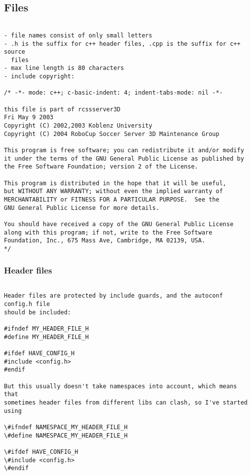 \subsection{Files}
\begin{verbatim}

- file names consist of only small letters
- .h is the suffix for c++ header files, .cpp is the suffix for c++ source 
  files
- max line length is 80 characters
- include copyright:

/* -*- mode: c++; c-basic-indent: 4; indent-tabs-mode: nil -*-
   
this file is part of rcssserver3D
Fri May 9 2003
Copyright (C) 2002,2003 Koblenz University
Copyright (C) 2004 RoboCup Soccer Server 3D Maintenance Group

This program is free software; you can redistribute it and/or modify
it under the terms of the GNU General Public License as published by
the Free Software Foundation; version 2 of the License.
  
This program is distributed in the hope that it will be useful,
but WITHOUT ANY WARRANTY; without even the implied warranty of
MERCHANTABILITY or FITNESS FOR A PARTICULAR PURPOSE.  See the
GNU General Public License for more details.
 
You should have received a copy of the GNU General Public License
along with this program; if not, write to the Free Software
Foundation, Inc., 675 Mass Ave, Cambridge, MA 02139, USA.
*/

\end{verbatim}
\subsubsection{Header files}
\begin{verbatim}

Header files are protected by include guards, and the autoconf config.h file
should be included:

#ifndef MY_HEADER_FILE_H
#define MY_HEADER_FILE_H

#ifdef HAVE_CONFIG_H
#include <config.h>
#endif

But this usually doesn't take namespaces into account, which means that 
sometimes header files from different libs can clash, so I've started using

\#ifndef NAMESPACE_MY_HEADER_FILE_H
\#define NAMESPACE_MY_HEADER_FILE_H

\#ifdef HAVE_CONFIG_H
\#include <config.h>
\#endif

\end{verbatim}

